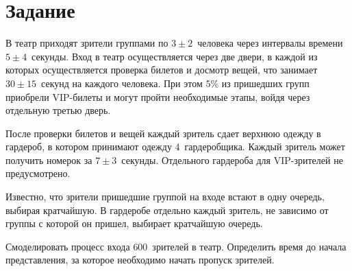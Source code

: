 \chapter{Задание}

В театр приходят зрители группами по $3\pm2$~человека через интервалы времени
$5\pm4$~секунды. Вход в театр осуществляется через две двери, в каждой из
которых осуществляется проверка билетов и досмотр вещей, что занимает
$30\pm15$~секунд на каждого человека. При этом $5\%$ из пришедших групп
приобрели VIP-билеты и могут пройти необходимые этапы, войдя через отдельную
третью дверь.

После проверки билетов и вещей каждый зритель сдает верхнюю одежду в гардероб, в
котором принимают одежду $4$~гардеробщика. Каждый зритель может получить номерок
за $7\pm3$~секунды. Отдельного гардероба для VIP-зрителей не предусмотрено.

Известно, что зрители пришедшие группой на входе встают в одну очередь, выбирая
кратчайшую. В гардеробе отдельно каждый зритель, не зависимо от группы с которой
он пришел, выбирает кратчайшую очередь.

Смоделировать процесс входа $600$~зрителей в театр. Определить время до начала
представления, за которое необходимо начать пропуск зрителей.

